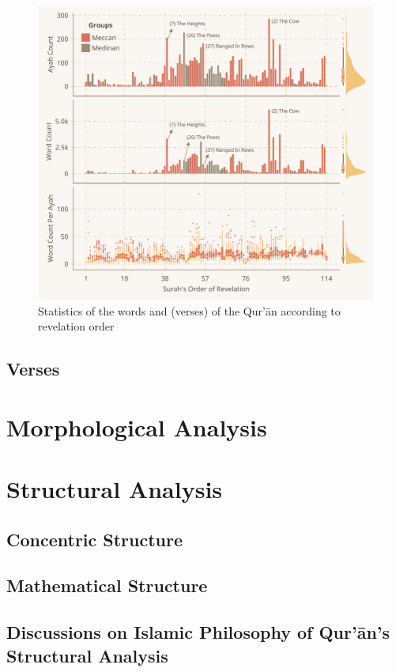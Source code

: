 \begin{figure}[!b]
    \centering
    \includegraphics[width=\textwidth]{img/plot2.pdf}
    \caption{Statistics of the words and   (verses) of the Qur'\=an according to revelation order}
    \label{fig:ch4_ayah_word_count_rev_order}
\end{figure}

\subsection{Verses}\label{sec:ch4_desc_stat_verse}
\section{Morphological Analysis}\label{sec:ch4_morphological_analysis}
\section{Structural Analysis}\label{sec:ch4_structural_analysis}
\subsection{Concentric Structure}
\subsection{Mathematical Structure}
\subsection{Discussions on Islamic Philosophy of Qur'\=an's Structural Analysis}
